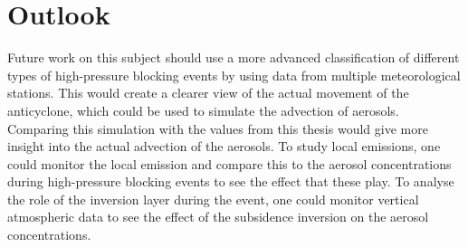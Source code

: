 \section{Outlook}
Future work on this subject should use a more advanced classification of different types of high-pressure blocking events by using data from multiple meteorological stations. This would create a clearer view of the actual movement of the anticyclone, which could be used to simulate the advection of aerosols. Comparing this simulation with the values from this thesis would give more insight into the actual advection of the aerosols. To study local emissions, one could monitor the local emission and compare this to the aerosol concentrations during high-pressure blocking events to see the effect that these play. To analyse the role of the inversion layer during the event, one could monitor vertical atmospheric data to see the effect of the subsidence inversion on the aerosol concentrations.


